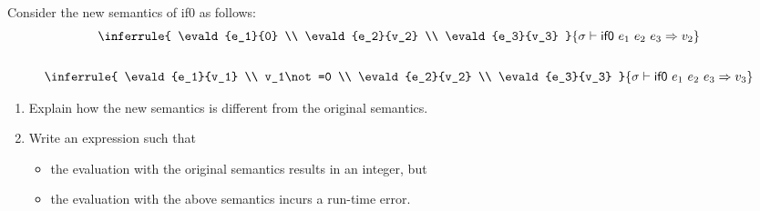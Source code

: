 \begin{exercise}

  Consider the new semantics of \textsf{if0} as follows:
\[
  \begin{array}{c}
  \inferrule
  { \evald{e_1}{0} \\ \evald{e_2}{v_2} \\ \evald{e_3}{v_3} }
  { \evald{\eifz{e_1}{e_2}{e_3}}{v_2} }
  \\[2em]
  \inferrule
  { \evald{e_1}{v_1} \\ v_1\not=0 \\ \evald{e_2}{v_2} \\ \evald{e_3}{v_3} }
  { \evald{\eifz{e_1}{e_2}{e_3}}{v_3} }
  \end{array}
\]

\begin{enumerate}
  \item Explain how the new semantics is different from the original semantics.
  \item Write an \lang expression such that
  \begin{itemize}
    \item the evaluation with the original semantics results in an integer, but
    \item the evaluation with the above semantics incurs a run-time error.
  \end{itemize}
\end{enumerate}

\end{exercise}

